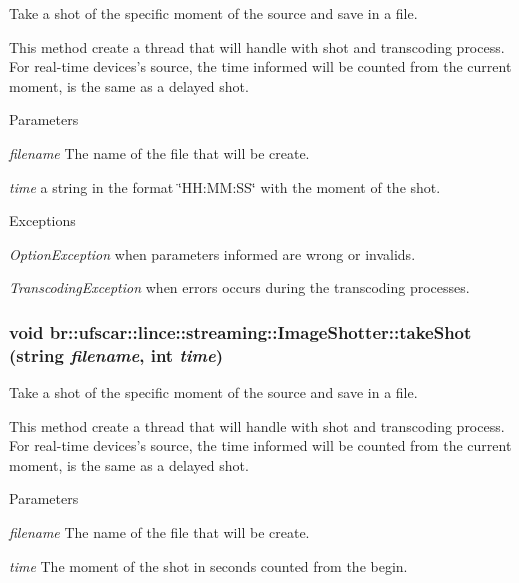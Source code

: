 Take a shot of the specific moment of the source and save in a file. 

This method create a thread that will handle with shot and transcoding process. For real-\/time devices's source, the time informed will be counted from the current moment, is the same as a delayed shot. 
\begin{DoxyParams}{Parameters}
\item[{\em filename}]The name of the file that will be create. \item[{\em time}]a string in the format \char`\"{}HH:MM:SS\char`\"{} with the moment of the shot. \end{DoxyParams}

\begin{DoxyExceptions}{Exceptions}
\item[{\em OptionException}]when parameters informed are wrong or invalids. \item[{\em TranscodingException}]when errors occurs during the transcoding processes. \end{DoxyExceptions}
\hypertarget{classbr_1_1ufscar_1_1lince_1_1streaming_1_1ImageShotter_a854a62146dd7af6bfe5c547be019e92b}{
\subsubsection[{takeShot}]{\setlength{\rightskip}{0pt plus 5cm}void br::ufscar::lince::streaming::ImageShotter::takeShot (string {\em filename}, \/  int {\em time})}}
\label{classbr_1_1ufscar_1_1lince_1_1streaming_1_1ImageShotter_a854a62146dd7af6bfe5c547be019e92b}


Take a shot of the specific moment of the source and save in a file. 

This method create a thread that will handle with shot and transcoding process. For real-\/time devices's source, the time informed will be counted from the current moment, is the same as a delayed shot. 
\begin{DoxyParams}{Parameters}
\item[{\em filename}]The name of the file that will be create. \item[{\em time}]The moment of the shot in seconds counted from the begin. \end{DoxyParams}

